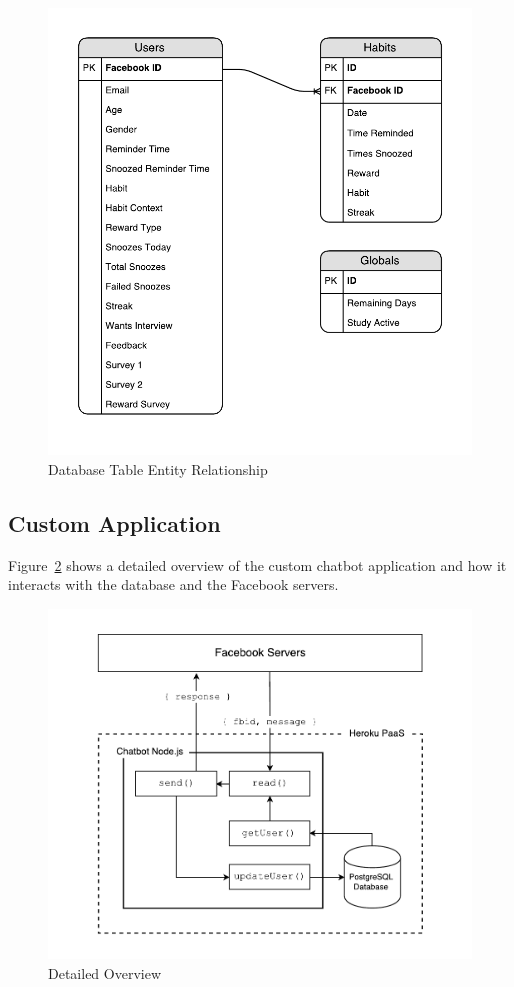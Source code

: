 \begin{figure}[H]
    \centering
    \includegraphics[width=5in]{../resources/diagrams/database-diagram.pdf}
    \caption{Database Table Entity Relationship}
    \label{fig:db_diagram}
\end{figure}


\subsection{Custom Application}
Figure~\ref{fig:prototype_detailed_overview} shows a detailed overview of the custom chatbot application and how it interacts with the database and the Facebook servers.

\begin{figure}[H]
    \centering
    \includegraphics[width=6in]{../resources/diagrams/chatbot-detailed-overview.pdf}
    \caption{Detailed Overview}
    \label{fig:prototype_detailed_overview}
\end{figure}


